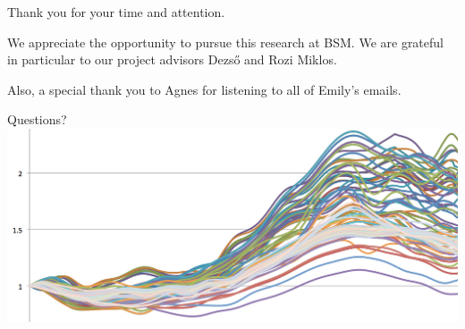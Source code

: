 \documentclass{beamer}
\begin{document}
\begin{frame}
Thank you for your time and attention.

We appreciate the opportunity to pursue this research at BSM. We are grateful in particular to our project advisors Dezs\H o and Rozi Miklos. 

Also, a special thank you to Agnes for listening to all of Emily's emails.

 
\end{frame}

\begin{frame}{Questions?}
\includegraphics[scale = .35]{yay.png}

\end{frame}
\end{document}
